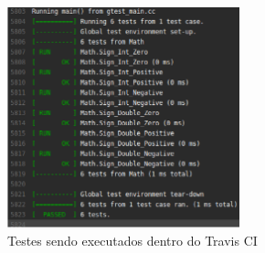 \begin{figure}[h]
	\centering
	\includegraphics[width=0.6\textwidth]{figuras/vv_travis_tests.eps}
	\caption{Testes sendo executados dentro do Travis CI}
	\label{img:travis_tests}
\end{figure}

